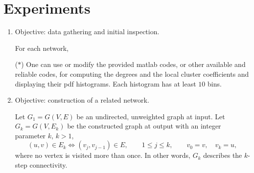 %
% 

\section*{Experiments}


\begin{enumerate}
\item Objective: data gathering and initial inspection.
  
  For each network,

  ($\ast$) One can use or modify the provided {\sc matlab} codes, or
  other available and reliable codes, for computing the degrees and
  the local cluster coefficients and displaying their {\sc pdf}
  histograms. Each histogram has at least $10$ bins.
    
\item Objective: construction of a related network.

  Let $G_{1} = G(V,E)$ be an undirected, unweighted graph at
  input. Let $G_{k}=G(V,E_{k}) $ be the constructed graph at output
  with an integer parameter $k$, $k>1$,
  \[
    (u,v) \in E_{k} \iff (v_{j}, v_{j-1}) \in E,
    \qquad 1\leq j \leq k,
    \qquad v_0 = v, \quad v_k = u, 
  \] 
  where no vertex is visited more than once.  In other words, $G_{k}$
  describes the $k$-step connectivity.
    

\end{enumerate}
